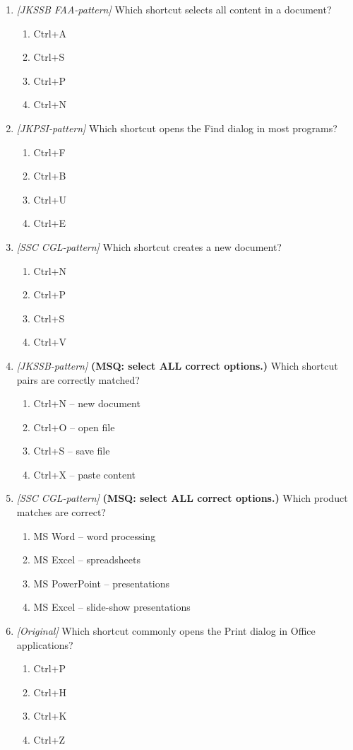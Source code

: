 \begin{enumerate}[label=\textbf{Q\arabic*.}, leftmargin=*]
\item \textit{[JKSSB FAA-pattern]} Which shortcut selects all content in a document?
  \begin{enumerate}[label=\Alph*.]
    \item Ctrl+A
    \item Ctrl+S
    \item Ctrl+P
    \item Ctrl+N
  \end{enumerate}
\item \textit{[JKPSI-pattern]} Which shortcut opens the Find dialog in most programs?
  \begin{enumerate}[label=\Alph*.]
    \item Ctrl+F
    \item Ctrl+B
    \item Ctrl+U
    \item Ctrl+E
  \end{enumerate}
\item \textit{[SSC CGL-pattern]} Which shortcut creates a new document?
  \begin{enumerate}[label=\Alph*.]
    \item Ctrl+N
    \item Ctrl+P
    \item Ctrl+S
    \item Ctrl+V
  \end{enumerate}
\item \textit{[JKSSB-pattern]} \textbf{(MSQ: select ALL correct options.)} Which shortcut pairs are correctly matched?
  \begin{enumerate}[label=\Alph*.]
    \item Ctrl+N -- new document
    \item Ctrl+O -- open file
    \item Ctrl+S -- save file
    \item Ctrl+X -- paste content
  \end{enumerate}
\item \textit{[SSC CGL-pattern]} \textbf{(MSQ: select ALL correct options.)} Which product matches are correct?
  \begin{enumerate}[label=\Alph*.]
    \item MS Word -- word processing
    \item MS Excel -- spreadsheets
    \item MS PowerPoint -- presentations
    \item MS Excel -- slide-show presentations
  \end{enumerate}
\item \textit{[Original]} Which shortcut commonly opens the Print dialog in Office applications?
  \begin{enumerate}[label=\Alph*.]
\item Ctrl+P
   \item Ctrl+H
   \item Ctrl+K
   \item Ctrl+Z
  \end{enumerate}


\end{enumerate}
